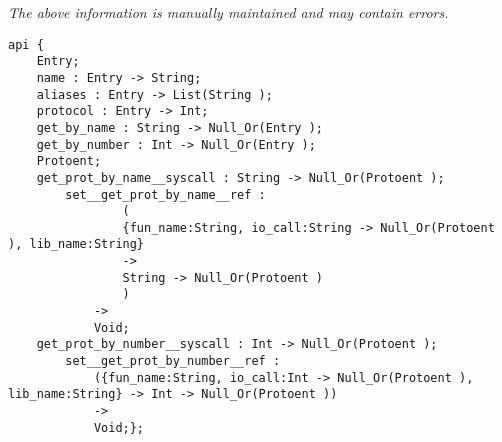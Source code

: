 \label{api:Net\_Protocol\_Db}

{\tiny \it The above information is manually maintained and may contain errors.}
\begin{verbatim}
api {
    Entry;
    name : Entry -> String;
    aliases : Entry -> List(String );
    protocol : Entry -> Int;
    get_by_name : String -> Null_Or(Entry );
    get_by_number : Int -> Null_Or(Entry );
    Protoent;
    get_prot_by_name__syscall : String -> Null_Or(Protoent );
        set__get_prot_by_name__ref :
                (
                {fun_name:String, io_call:String -> Null_Or(Protoent ), lib_name:String}
                ->
                String -> Null_Or(Protoent )
                )
            ->
            Void;
    get_prot_by_number__syscall : Int -> Null_Or(Protoent );
        set__get_prot_by_number__ref :
            ({fun_name:String, io_call:Int -> Null_Or(Protoent ), lib_name:String} -> Int -> Null_Or(Protoent ))
            ->
            Void;};
\end{verbatim}
